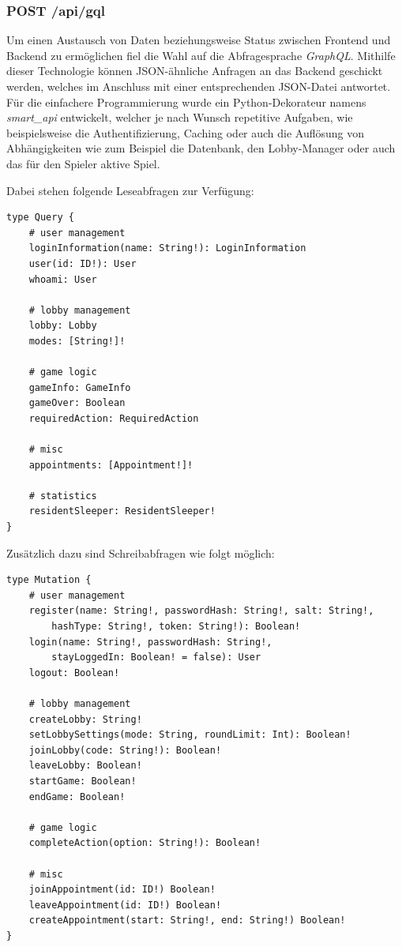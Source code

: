 \subsubsection{POST /api/gql}
Um einen Austausch von Daten beziehungsweise Status zwischen Frontend und Backend zu ermöglichen fiel die Wahl auf die Abfragesprache \textit{GraphQL}. Mithilfe dieser Technologie können JSON-ähnliche Anfragen an das Backend geschickt werden, welches im Anschluss mit einer entsprechenden JSON-Datei antwortet. Für die einfachere Programmierung wurde ein Python-Dekorateur namens \textit{smart\_api} entwickelt, welcher je nach Wunsch repetitive Aufgaben, wie beispielsweise die Authentifizierung, Caching oder auch die Auflösung von Abhängigkeiten wie zum Beispiel die Datenbank, den Lobby-Manager oder auch das für den Spieler aktive Spiel.

Dabei stehen folgende Leseabfragen zur Verfügung:

\begin{lstlisting}
type Query {
	# user management
	loginInformation(name: String!): LoginInformation
	user(id: ID!): User
	whoami: User
	
	# lobby management
	lobby: Lobby
	modes: [String!]!
	
	# game logic
	gameInfo: GameInfo
	gameOver: Boolean
	requiredAction: RequiredAction
	
	# misc
	appointments: [Appointment!]!
	
	# statistics
	residentSleeper: ResidentSleeper!
}
\end{lstlisting}

Zusätzlich dazu sind Schreibabfragen wie folgt möglich:

\begin{lstlisting}
type Mutation {
	# user management
	register(name: String!, passwordHash: String!, salt: String!, 
		hashType: String!, token: String!): Boolean!
	login(name: String!, passwordHash: String!, 
		stayLoggedIn: Boolean! = false): User
	logout: Boolean!
	
	# lobby management
	createLobby: String!
	setLobbySettings(mode: String, roundLimit: Int): Boolean!
	joinLobby(code: String!): Boolean!
	leaveLobby: Boolean!
	startGame: Boolean!
	endGame: Boolean!
	
	# game logic
	completeAction(option: String!): Boolean!
	
	# misc
	joinAppointment(id: ID!) Boolean!
	leaveAppointment(id: ID!) Boolean!
	createAppointment(start: String!, end: String!) Boolean!
}
\end{lstlisting}

